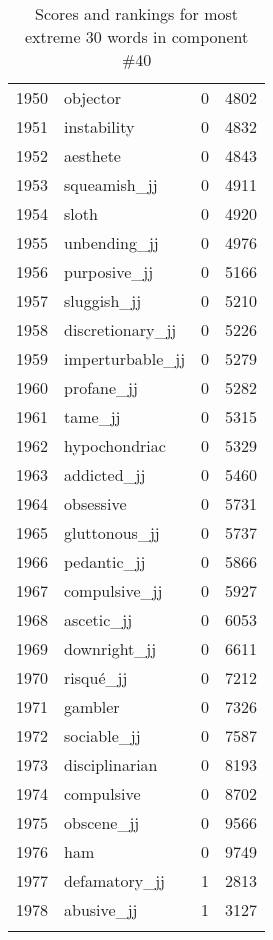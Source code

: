 \begin{longtable}[!htbp]{| rlr@{.}l |}
    1950 & objector & 0 & 4802 \\
    1951 & instability & 0 & 4832 \\
    1952 & aesthete & 0 & 4843 \\
    1953 & squeamish\_jj & 0 & 4911 \\
    1954 & sloth & 0 & 4920 \\
    1955 & unbending\_jj & 0 & 4976 \\
    1956 & purposive\_jj & 0 & 5166 \\
    1957 & sluggish\_jj & 0 & 5210 \\
    1958 & discretionary\_jj & 0 & 5226 \\
    1959 & imperturbable\_jj & 0 & 5279 \\
    1960 & profane\_jj & 0 & 5282 \\
    1961 & tame\_jj & 0 & 5315 \\
    1962 & hypochondriac & 0 & 5329 \\
    1963 & addicted\_jj & 0 & 5460 \\
    1964 & obsessive & 0 & 5731 \\
    1965 & gluttonous\_jj & 0 & 5737 \\
    1966 & pedantic\_jj & 0 & 5866 \\
    1967 & compulsive\_jj & 0 & 5927 \\
    1968 & ascetic\_jj & 0 & 6053 \\
    1969 & downright\_jj & 0 & 6611 \\
    1970 & risqué\_jj & 0 & 7212 \\
    1971 & gambler & 0 & 7326 \\
    1972 & sociable\_jj & 0 & 7587 \\
    1973 & disciplinarian & 0 & 8193 \\
    1974 & compulsive & 0 & 8702 \\
    1975 & obscene\_jj & 0 & 9566 \\
    1976 & ham & 0 & 9749 \\
    1977 & defamatory\_jj & 1 & 2813 \\
    1978 & abusive\_jj & 1 & 3127 \\
    \hline
    \caption{Scores and rankings for most extreme 30 words in component \#40} \\
\end{longtable}

